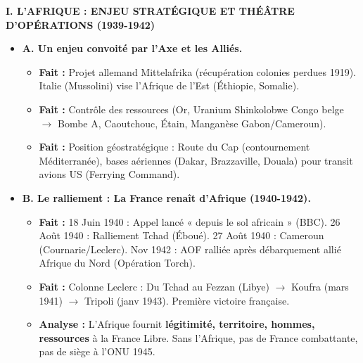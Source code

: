 \documentclass[11pt]{article}
\newcommand{\cle}[1]{{\popxbold\color{popdark}#1}}
\begin{document}
\begin{exoresolu}
\textbf{I. L'AFRIQUE : ENJEU STRATÉGIQUE ET THÉÂTRE D'OPÉRATIONS (1939-1942)}
\begin{itemize}
    \item \textbf{A. Un enjeu convoité par l'Axe et les Alliés.}
    \begin{itemize}
        \item \textbf{Fait :} Projet allemand \cle{Mittelafrika} (récupération colonies perdues 1919). Italie (Mussolini) vise l'Afrique de l'Est (Éthiopie, Somalie).
        \item \textbf{Fait :} Contrôle des ressources (Or, Uranium \cle{Shinkolobwe} Congo belge $\rightarrow$ Bombe A, Caoutchouc, Étain, Manganèse Gabon/Cameroun).
        \item \textbf{Fait :} Position géostratégique : Route du Cap (contournement Méditerranée), bases aériennes (Dakar, Brazzaville, Douala) pour transit avions US (Ferrying Command).
    \end{itemize}
    \item \textbf{B. Le ralliement : La France renaît d'Afrique (1940-1942).}
    \begin{itemize}
        \item \textbf{Fait :} \cle{18 Juin 1940} : Appel lancé « depuis le sol africain » (BBC). \cle{26 Août 1940} : Ralliement Tchad (Éboué). \cle{27 Août 1940} : Cameroun (Cournarie/Leclerc). \cle{Nov 1942} : AOF ralliée après débarquement allié Afrique du Nord (Opération Torch).
        \item \textbf{Fait :} \cle{Colonne Leclerc} : Du Tchad au Fezzan (Libye) $\rightarrow$ Koufra (mars 1941) $\rightarrow$ Tripoli (janv 1943). Première victoire française.
        \item \textbf{Analyse :} L'Afrique fournit \textbf{légitimité, territoire, hommes, ressources} à la France Libre. Sans l'Afrique, pas de France combattante, pas de siège à l'ONU 1945.
    \end{itemize}
\end{itemize}


\end{exoresolu}
\end{document}
